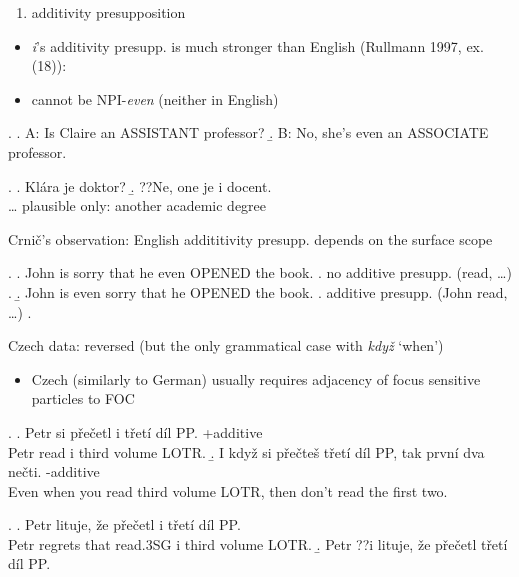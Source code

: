 \documentclass[ignorenonframetext,]{beamer}
\providecommand{\tightlist}{%
  \setlength{\itemsep}{0pt}\setlength{\parskip}{0pt}}
\begin{document}
\begin{frame}

\begin{enumerate}
\def\labelenumi{\arabic{enumi})}
\setcounter{enumi}{1}
\tightlist
\item
  additivity presupposition
\end{enumerate}

\begin{itemize}
\tightlist
\item
  \emph{i}'s additivity presupp. is much stronger than English (Rullmann
  1997, ex.(18)):
\item
  cannot be NPI-\emph{even} (neither in English)
\end{itemize}

\ex. \a. A: Is Claire an ASSISTANT professor? \b. B: No, she's even an
ASSOCIATE professor.

\ex. \a. Klára je doktor? \b. ??Ne, one je i docent.\\
\ldots{} plausible only: another academic degree

\end{frame}

\begin{frame}

Crnič's observation: English addititivity presupp. depends on the
surface scope

\ex. \a. John is sorry that he even OPENED the book. \a. no additive
presupp. (read, \ldots{}) \z. \b. John is even sorry that he OPENED the
book. \a. additive presupp. (John read, \ldots{}) \z.

\end{frame}

\begin{frame}

Czech data: reversed (but the only grammatical case with \emph{když}
`when')

\begin{itemize}
\tightlist
\item
  Czech (similarly to German) usually requires adjacency of focus
  sensitive particles to FOC
\end{itemize}

\ex. \a. Petr si přečetl i třetí díl PP. \hfill +additive\\
Petr read i third volume LOTR. \b. I když si přečteš třetí díl PP, tak
první dva nečti. \hfill -additive\\
Even when you read third volume LOTR, then don't read the first two.

\ex. \a. Petr lituje, že přečetl i třetí díl PP.\\
Petr regrets that read.3SG i third volume LOTR. \b. Petr ??i lituje, že
přečetl třetí díl PP.

\end{frame}
\end{document}
